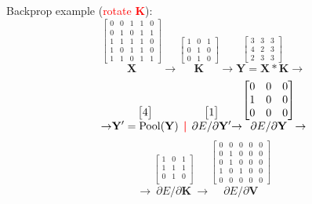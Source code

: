 \documentclass[11pt,landscape,a4paper,fleqn]{article}
\newcommand{\sep}{\,\textcolor{red}{\bm|}\,}
\def\mymatrix#1{\mathbf{#1}}
\def\mK{{\mymatrix{K}}}
\def\mV{{\mymatrix{V}}}
\def\mX{{\mymatrix{X}}}
\def\mY{{\mymatrix{Y}}}
\begin{document}
\begin{multicols*}{4}
Backprop example (\textcolor{red}{rotate $\mK$}):
\[
    \stackrel{\begin{bmatrix}
        0 & 0 & 1 & 1 & 0 \\
        0 & 1 & 0 & 1 & 1 \\
        1 & 1 & 1 & 1 & 0 \\
        1 & 0 & 1 & 1 & 0 \\
        1 & 1 & 0 & 1 & 1
    \end{bmatrix}}{\mX} \to
    \stackrel{\begin{bmatrix}
        1 & 0 & 1 \\
        0 & 1 & 0 \\
        0 & 1 & 0 
    \end{bmatrix}}{\mK} \to
    \stackrel{\begin{bmatrix}
        3 & 3 & 3 \\
        4 & 2 & 3 \\
        2 & 3 & 3 
    \end{bmatrix}}{\mY = \mX * \mK} \to
\]
\[
    \to\stackrel{\begin{bmatrix}
        4
    \end{bmatrix}}{\mY' = \mathrm{Pool}(\mY)}
    \sep
    \stackrel{\begin{bmatrix}
        1
    \end{bmatrix}}{\partial E / \partial \mY'} \to
    \stackrel{\begin{bmatrix}
        0 & 0 & 0 \\
        1 & 0 & 0 \\
        0 & 0 & 0 \\
    \end{bmatrix}}{\partial E / \partial \mY} \to
\]
\[
    \to\stackrel{\begin{bmatrix}
        1 & 0 & 1 \\
        1 & 1 & 1 \\
        0 & 1 & 0 \\
    \end{bmatrix}}{\partial E / \partial \mK} \to
    \stackrel{\begin{bmatrix}
        0 & 0 & 0 & 0 & 0 \\
        0 & 1 & 0 & 0 & 0 \\
        0 & 1 & 0 & 0 & 0 \\
        1 & 0 & 1 & 0 & 0 \\
        0 & 0 & 0 & 0 & 0
    \end{bmatrix}}{\partial E / \partial \mV}
\]


\end{multicols*}
\end{document}
